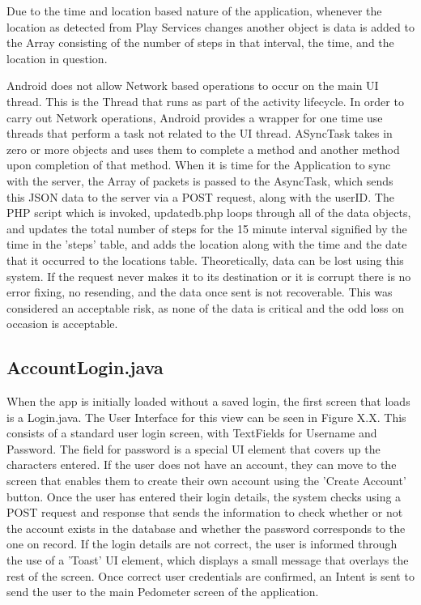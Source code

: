 \documentclass{l4proj}
\begin{document}
Due to the time and location based nature of the application, whenever the location as detected from Play Services changes another object is data is added to the Array consisting of the number of steps in that interval, the time, and the location in question. 

Android does not allow Network based operations to occur on the main UI thread. This is the Thread that runs as part of the activity lifecycle. In order to carry out Network operations, Android provides a wrapper for one time use threads that perform a task not related to the UI thread. ASyncTask takes in zero or more objects and uses them to complete a method and another method upon completion of that method. When it is time for the Application to sync with the server, the Array of packets is passed to the AsyncTask, which sends this JSON data to the server via a POST request, along with the userID. The PHP script which is invoked, updatedb.php loops through all of the data objects, and updates the total number of steps for the 15 minute interval signified by the time in the 'steps' table, and adds the location along with the time and the date that it occurred to the locations table. Theoretically, data can be lost using this system. If the request never makes it to its destination or it is corrupt there is no error fixing, no resending, and the data once sent is not recoverable. This was considered an acceptable risk, as none of the data is critical and the odd loss on occasion is acceptable.

\subsection{AccountLogin.java}

When the app is initially loaded without a saved login, the first screen that loads is a Login.java. The User Interface for this view can be seen in Figure X.X. This consists of a standard user login screen, with TextFields for Username and Password. The field for password is a special UI element that covers up the characters entered. If the user does not have an account, they can move to the screen that enables them to create their own account using the 'Create Account' button. Once the user has entered their login details, the system checks using a POST request and response that sends the information to check whether or not the account exists in the database and whether the password corresponds to the one on record. If the login details are not correct, the user is informed through the use of a 'Toast' UI element, which displays a small message that overlays the rest of the screen. Once correct user credentials are confirmed, an Intent is sent to send the user to the main Pedometer screen of the application.
\end{document}
